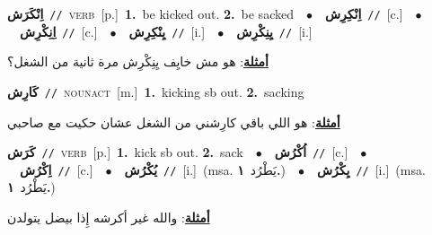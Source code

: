 \documentclass[10pt,a4paper,twoside]{article} %
\begin{document}
\begin{multicols}{2}
{\setlength\topsep{0pt}\textbf{\foreignlanguage{arabic}{اِنْكَرَش}}\ {\color{gray}\texttt{//}\color{black}}\ \textsc{verb}\ [p.]\ \textbf{1.}~be kicked out.  \textbf{2.}~be sacked\ \ $\bullet$\ \ \setlength\topsep{0pt}\textbf{\foreignlanguage{arabic}{اِنْكِرِش}}\ {\color{gray}\texttt{//}\color{black}}\ [c.]\ \ $\bullet$\ \ \setlength\topsep{0pt}\textbf{\foreignlanguage{arabic}{اِنِكْرِش}}\ {\color{gray}\texttt{//}\color{black}}\ [c.]\ \ $\bullet$\ \ \setlength\topsep{0pt}\textbf{\foreignlanguage{arabic}{يِنْكِرِش}}\ {\color{gray}\texttt{//}\color{black}}\ [i.]\ \ $\bullet$\ \ \setlength\topsep{0pt}\textbf{\foreignlanguage{arabic}{يِنِكْرِش}}\ {\color{gray}\texttt{//}\color{black}}\ [i.]\  \begin{flushright}\color{gray}\foreignlanguage{arabic}{\textbf{\underline{\foreignlanguage{arabic}{أمثلة}}}: هو مش خايِف يِنِكْرِش مرة ثانية من الشغل؟}\end{flushright}\color{black}} \vspace{2mm}

{\setlength\topsep{0pt}\textbf{\foreignlanguage{arabic}{كَارِش}}\ {\color{gray}\texttt{//}\color{black}}\ \textsc{noun\textunderscore act}\ [m.]\ \textbf{1.}~kicking sb out.  \textbf{2.}~sacking\  \begin{flushright}\color{gray}\foreignlanguage{arabic}{\textbf{\underline{\foreignlanguage{arabic}{أمثلة}}}: هو اللي باقي كارِشني من الشغل عشان حكيت مع صاحبي}\end{flushright}\color{black}} \vspace{2mm}

{\setlength\topsep{0pt}\textbf{\foreignlanguage{arabic}{كَرَش}}\ {\color{gray}\texttt{//}\color{black}}\ \textsc{verb}\ [p.]\ \textbf{1.}~kick sb out.  \textbf{2.}~sack\ \ $\bullet$\ \ \setlength\topsep{0pt}\textbf{\foreignlanguage{arabic}{اُكْرُش}}\ {\color{gray}\texttt{//}\color{black}}\ [c.]\ \ $\bullet$\ \ \setlength\topsep{0pt}\textbf{\foreignlanguage{arabic}{اِكْرُش}}\ {\color{gray}\texttt{//}\color{black}}\ [c.]\ \ $\bullet$\ \ \setlength\topsep{0pt}\textbf{\foreignlanguage{arabic}{يُكْرُش}}\ {\color{gray}\texttt{//}\color{black}}\ [i.]\ \color{gray}(msa. \foreignlanguage{arabic}{يَطْرُد}~\foreignlanguage{arabic}{\textbf{١.}})\color{black}\ \ $\bullet$\ \ \setlength\topsep{0pt}\textbf{\foreignlanguage{arabic}{يِكْرُش}}\ {\color{gray}\texttt{//}\color{black}}\ [i.]\ \color{gray}(msa. \foreignlanguage{arabic}{يَطْرُد}~\foreignlanguage{arabic}{\textbf{١.}})\color{black}\  \begin{flushright}\color{gray}\foreignlanguage{arabic}{\textbf{\underline{\foreignlanguage{arabic}{أمثلة}}}: والله غير أكرشه إِذا بيضل يتولدن}\end{flushright}\color{black}} \vspace{2mm}


\end{multicols}
\end{document}
